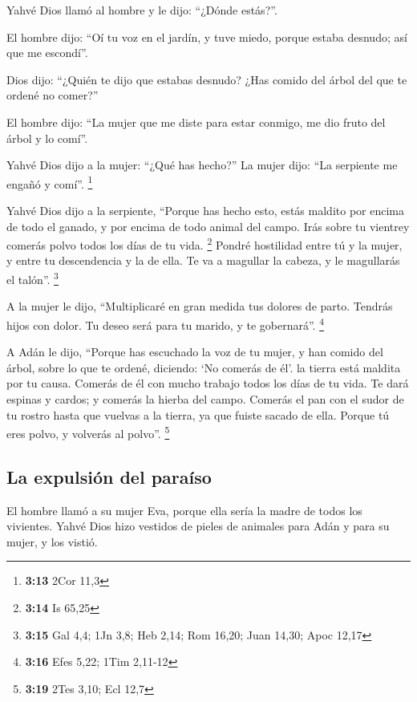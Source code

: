 \begin{paracol}{2}
 Yahvé Dios llamó al hombre y le dijo: ``¿Dónde estás?''.

 El hombre dijo: ``Oí tu voz en el jardín, y tuve miedo,
porque estaba desnudo; así que me escondí''.

 Dios dijo: ``¿Quién te dijo que estabas desnudo? ¿Has
comido del árbol del que te ordené no comer?''

 El hombre dijo: ``La mujer que me diste para estar
conmigo, me dio fruto del árbol y lo comí''.

 Yahvé Dios dijo a la mujer: ``¿Qué has hecho?'' La mujer
dijo: ``La serpiente me engañó y comí''. \footnote{\textbf{3:13} 2Cor
  11,3}

 Yahvé Dios dijo a la serpiente, ``Porque has hecho esto,
estás maldito por encima de todo el ganado, y por encima de todo animal
del campo. Irás sobre tu vientrey comerás polvo todos los días de tu
vida. \footnote{\textbf{3:14} Is 65,25}  Pondré
hostilidad entre tú y la mujer, y entre tu descendencia y la de ella. Te
va a magullar la cabeza, y le magullarás el talón''. \footnote{\textbf{3:15}
  Gal 4,4; 1Jn 3,8; Heb 2,14; Rom 16,20; Juan 14,30; Apoc 12,17}

 A la mujer le dijo, ``Multiplicaré en gran medida tus
dolores de parto. Tendrás hijos con dolor. Tu deseo será para tu marido,
y te gobernará''. \footnote{\textbf{3:16} Efes 5,22; 1Tim 2,11-12}

 A Adán le dijo, ``Porque has escuchado la voz de tu
mujer, y han comido del árbol, sobre lo que te ordené, diciendo: `No
comerás de él'. la tierra está maldita por tu causa. Comerás de él con
mucho trabajo todos los días de tu vida.  Te dará espinas
y cardos; y comerás la hierba del campo.  Comerás el pan
con el sudor de tu rostro hasta que vuelvas a la tierra, ya que fuiste
sacado de ella. Porque tú eres polvo, y volverás al polvo''. \footnote{\textbf{3:19}
  2Tes 3,10; Ecl 12,7}

\hypertarget{la-expulsiuxf3n-del-parauxedso}{%
\subsection{La expulsión del
paraíso}\label{la-expulsiuxf3n-del-parauxedso}}

 El hombre llamó a su mujer Eva, porque ella sería la
madre de todos los vivientes.  Yahvé Dios hizo vestidos
de pieles de animales para Adán y para su mujer, y los vistió.


\end{paracol}
